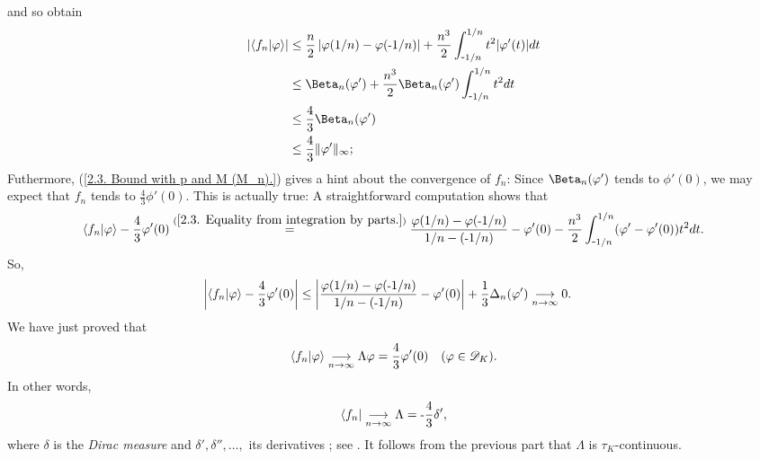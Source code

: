 %
and so obtain %
%
  \begin{align}
    \magnitude{\bra{f_n}\ket{\phi}}
    & \leq  
      \frac{n}{2}\magnitude{\phi(1/n) - \phi(\minus 1/n)}
        + 
      \frac{n^3}{2}\int_{\minus1/n}^{1/n} t^{2}\lvert\phi'(t)\rvert dt
      \\
      & \leq  
        \Beta_{n}(\phi') 
          + 
        \frac{n^3}{2} \Beta_{n}(\phi') \int_{\minus1/n}^{1/n} t^{2} dt \\
      \label{2.3. Bound with p and M (M_n).}
      & \leq 
      \frac{4}{3} \Beta_{n}(\phi') \\
      \label{2.3. Bound with p and M (concrete).}
      & \leq 
      \frac{4}{3} \| \phi' \|_\infty;
  \end{align}
%
Futhermore, %
%
  (\ref{2.3. Bound with p and M (M_n).}) %
% 
gives a hint about the convergence of $f_n$: Since %
%
  $\Beta_{n}(\phi')$ tends to $\phi'(0)$, %
%
we may expect that %
%
  $f_n$ tends to $\frac{4}{3}\phi'(0)$. %
%
This is actually true: A straightforward computation shows that %
%
  \begin{align}
    \bra{f_n}\ket{\varphi} - \frac{4}{3}\varphi'(0)
      \overset{(\ref{2.3. Equality from integration by parts.})}{=} 
    \frac{\varphi(1/n) - \varphi(\text{\small{-}} 1/n)}{1/n - (\text{\small{-}} 1/n)}
    - \varphi'(0)
    - \frac{n^3}{2} \int_{\text{\small{-}} 1/n}^{1/n} (\varphi' - \varphi'(0)) t^{2} dt.
  \end{align}
%
So, 
%
  \begin{align}
    \left\lvert \bra{f_n}\ket{\varphi} -\frac{4}{3} \varphi'(0) \right\rvert 
      & \leq 
    \left\lvert 
      \frac{\varphi(1/n) - \varphi(\text{\small{-}} 1/n)}{1/n - (\text{\small{-}} 1/n)}
      - \varphi'(0)
     \right\rvert
    + \frac{1}{3}\Delta_{n}(\varphi') 
    \underset{n\to\infty}{\longrightarrow} 0.
  \end{align}
%
We have just proved that 
%
  \begin{align}\label{2.3. (f_n) converges to Dirac (1).}
    \bra{f_n}\ket{\varphi} \underset{n\to\infty}{\longrightarrow} \Lambda\varphi 
      = 
    \frac{4}{3}\varphi'(0) 
    \quad (\varphi\in \mathscr{D}_K).
  \end{align}
%
In other words, 
%
  \begin{align}
    \bra{f_n} \underset{n\to\infty}{\longrightarrow}\Lambda = \text{\small{-}} \frac{4}{3}\delta' ,
  \end{align}
%
where $\delta$ is the \textit{Dirac measure} and 
$\delta', \delta'', \dots, $ its derivatives ; see .
%
\newline\newline\noindent
It follows from the previous part that $\Lambda$ is $\tau_K$-continuous. %
